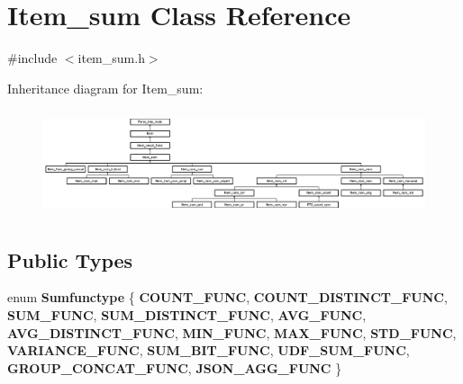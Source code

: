 \hypertarget{classItem__sum}{}\section{Item\+\_\+sum Class Reference}
\label{classItem__sum}


{\ttfamily \#include $<$item\+\_\+sum.\+h$>$}

Inheritance diagram for Item\+\_\+sum\+:\begin{figure}[H]
\begin{center}
\leavevmode
\includegraphics[height=3.130678cm]{classItem__sum}
\end{center}
\end{figure}
\subsection*{Public Types}
\begin{DoxyCompactItemize}
\item 
\mbox{\label{classItem__sum_aab1364c0f2d629b6fbe83380ecdb3693}} 
enum {\bfseries Sumfunctype} \{ \newline
{\bfseries C\+O\+U\+N\+T\+\_\+\+F\+U\+NC}, 
{\bfseries C\+O\+U\+N\+T\+\_\+\+D\+I\+S\+T\+I\+N\+C\+T\+\_\+\+F\+U\+NC}, 
{\bfseries S\+U\+M\+\_\+\+F\+U\+NC}, 
{\bfseries S\+U\+M\+\_\+\+D\+I\+S\+T\+I\+N\+C\+T\+\_\+\+F\+U\+NC}, 
\newline
{\bfseries A\+V\+G\+\_\+\+F\+U\+NC}, 
{\bfseries A\+V\+G\+\_\+\+D\+I\+S\+T\+I\+N\+C\+T\+\_\+\+F\+U\+NC}, 
{\bfseries M\+I\+N\+\_\+\+F\+U\+NC}, 
{\bfseries M\+A\+X\+\_\+\+F\+U\+NC}, 
\newline
{\bfseries S\+T\+D\+\_\+\+F\+U\+NC}, 
{\bfseries V\+A\+R\+I\+A\+N\+C\+E\+\_\+\+F\+U\+NC}, 
{\bfseries S\+U\+M\+\_\+\+B\+I\+T\+\_\+\+F\+U\+NC}, 
{\bfseries U\+D\+F\+\_\+\+S\+U\+M\+\_\+\+F\+U\+NC}, 
\newline
{\bfseries G\+R\+O\+U\+P\+\_\+\+C\+O\+N\+C\+A\+T\+\_\+\+F\+U\+NC}, 
{\bfseries J\+S\+O\+N\+\_\+\+A\+G\+G\+\_\+\+F\+U\+NC}
 \}
\end{DoxyCompactItemize}
